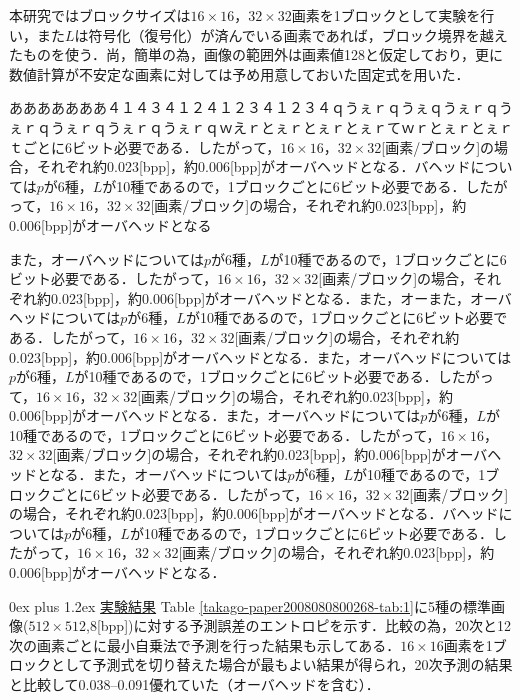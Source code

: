 \documentclass[9pt,dvipdfmx,uplatex]{jsarticle}
\makeatletter
\def\section{\@startsection {section}{1}{\z@}
{1ex plus -1ex minus-.2ex}%
{0ex plus 1.2ex}%
 {\normalsize\bf}%
 }
\makeatother
\begin{document}
本研究ではブロックサイズは$16\times16$，$32\times32$画素を1ブロックとして実験を行い，また$L$は符号化（復号化）が済んでいる画素であれば，ブロック境界を越えたものを使う．尚，簡単の為，画像の範囲外は画素値128と仮定しており，更に数値計算が不安定な画素に対しては予め用意しておいた固定式を用いた．

あああああああ４１４３４１２４１２３４１２３４ｑうぇｒｑうぇｑうぇｒｑうぇｒｑうぇｒｑうぇｒｑうぇｒｑｗえｒとぇｒとぇｒとぇｒてｗｒとぇｒとぇｒｔごとに6ビット必要である．したがって，$16\times 16$，$32\times 32$[画素/ブロック]の場合，それぞれ約0.023[bpp]，約0.006[bpp]がオーバヘッドとなる．バヘッドについては$p$が6種，$L$が10種であるので，1ブロックごとに6ビット必要である．したがって，$16\times 16$，$32\times 32$[画素/ブロック]の場合，それぞれ約0.023[bpp]，約0.006[bpp]がオーバヘッドとなる

また，オーバヘッドについては$p$が6種，$L$が10種であるので，1ブロックごとに6ビット必要である．したがって，$16\times 16$，$32\times 32$[画素/ブロック]の場合，それぞれ約0.023[bpp]，約0.006[bpp]がオーバヘッドとなる．また，オーまた，オーバヘッドについては$p$が6種，$L$が10種であるので，1ブロックごとに6ビット必要である．したがって，$16\times 16$，$32\times 32$[画素/ブロック]の場合，それぞれ約0.023[bpp]，約0.006[bpp]がオーバヘッドとなる．また，オーバヘッドについては$p$が6種，$L$が10種であるので，1ブロックごとに6ビット必要である．したがって，$16\times 16$，$32\times 32$[画素/ブロック]の場合，それぞれ約0.023[bpp]，約0.006[bpp]がオーバヘッドとなる．また，オーバヘッドについては$p$が6種，$L$が10種であるので，1ブロックごとに6ビット必要である．したがって，$16\times 16$，$32\times 32$[画素/ブロック]の場合，それぞれ約0.023[bpp]，約0.006[bpp]がオーバヘッドとなる．また，オーバヘッドについては$p$が6種，$L$が10種であるので，1ブロックごとに6ビット必要である．したがって，$16\times 16$，$32\times 32$[画素/ブロック]の場合，それぞれ約0.023[bpp]，約0.006[bpp]がオーバヘッドとなる．バヘッドについては$p$が6種，$L$が10種であるので，1ブロックごとに6ビット必要である．したがって，$16\times 16$，$32\times 32$[画素/ブロック]の場合，それぞれ約0.023[bpp]，約0.006[bpp]がオーバヘッドとなる．

\section{\underline{実験結果}}
Table \ref{takago-paper2008080800268-tab:1}に5種の標準画像($512\times512$,8[bpp])に対する予測誤差のエントロピを示す．比較の為，20次と12次の画素ごとに最小自乗法で予測を行った結果も示してある．$16\times 16$画素を1ブロックとして予測式を切り替えた場合が最もよい結果が得られ，20次予測の結果と比較して0.038--0.091優れていた（オーバヘッドを含む）．
\end{document}
